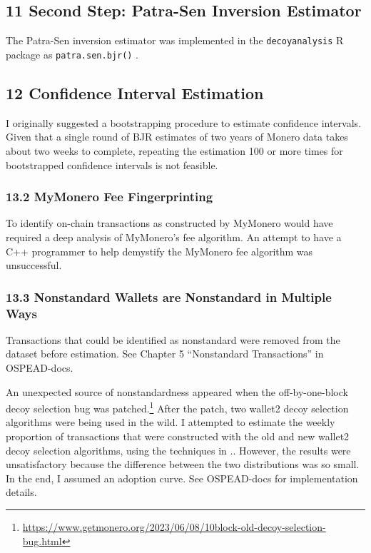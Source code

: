 \documentclass[english]{article}
\begin{document}
\subsection*{11 Second Step: Patra-Sen Inversion Estimator}

The Patra-Sen inversion estimator was implemented in the \texttt{decoyanalysis}
R package as \texttt{patra.sen.bjr()} .

\subsection*{12 Confidence Interval Estimation}

I originally suggested a bootstrapping procedure to estimate confidence
intervals. Given that a single round of BJR estimates of two years
of Monero data takes about two weeks to complete, repeating the estimation
100 or more times for bootstrapped confidence intervals is not feasible.

\subsubsection*{13.2 MyMonero Fee Fingerprinting}

To identify on-chain transactions as constructed by MyMonero would
have required a deep analysis of MyMonero's fee algorithm. An attempt
to have a C++ programmer to help demystify the MyMonero fee algorithm
was unsuccessful.

\subsubsection*{13.3 Nonstandard Wallets are Nonstandard in Multiple Ways}

Transactions that could be identified as nonstandard were removed
from the dataset before estimation. See Chapter 5 ``Nonstandard Transactions''
in OSPEAD-docs.

An unexpected source of nonstandardness appeared when the off-by-one-block
decoy selection bug was patched.\footnote{\href{https://www.getmonero.org/2023/06/08/10block-old-decoy-selection-bug.html}{https://www.getmonero.org/2023/06/08/10block-old-decoy-selection-bug.html}}
After the patch, two wallet2 decoy selection algorithms were being
used in the wild. I attempted to estimate the weekly proportion of
transactions that were constructed with the old and new wallet2 decoy
selection algorithms, using the techniques in \cite{Hall1981}.. However,
the results were unsatisfactory because the difference between the
two distributions was so small. In the end, I assumed an adoption
curve. See OSPEAD-docs for implementation details.
\end{document}
